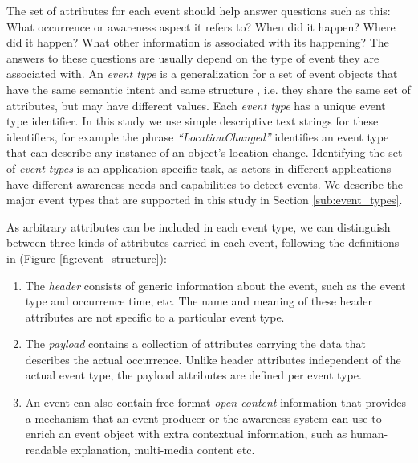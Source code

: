 The set of attributes for each event should help answer questions such as this: What occurrence or awareness aspect it refers to? When did it happen? Where did it happen? What other information is associated with its happening? The answers to these questions are usually depend on the type of event they are associated with. An \emph{event type} is a generalization for a set of event objects that have the same semantic intent and same structure \cite{Etzion2010}, i.e. they share the same set of attributes, but may have different values. Each \emph{event type} has a unique event type identifier. In this study we use simple descriptive text strings for these identifiers, for example the phrase \emph{``LocationChanged''} identifies an event type that can describe any instance of an object's location change. Identifying the set of \emph{event types} is an application specific task, as actors in different applications have different awareness needs and capabilities to detect events. We describe the major event types that are supported in this study in Section \ref{sub:event_types}.

As arbitrary attributes can be included in each event type, we can distinguish between three kinds of attributes carried in each event, following the definitions in \cite{Etzion2010} (Figure \ref{fig:event_structure}):

\begin{enumerate}
	\item The \emph{header} consists of generic information about the event, such as the event type and occurrence time, etc. The name and meaning of these header attributes are not specific to a particular event type.
	\item The \emph{payload} contains a collection of attributes carrying the data that describes the actual occurrence. Unlike header attributes independent of the actual event type, the payload attributes are defined per event type. 
	\item An event can also contain free-format \emph{open content} information that provides a mechanism that an event producer or the awareness system can use to enrich an event object with extra contextual information, such as human-readable explanation, multi-media content etc.
\end{enumerate}

